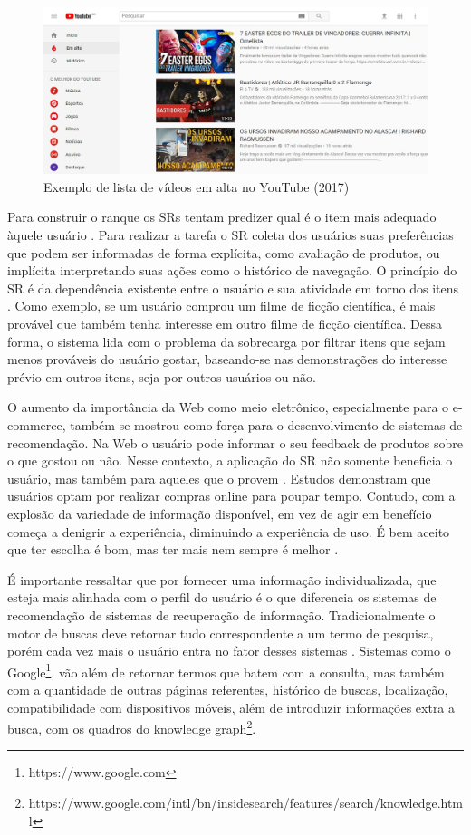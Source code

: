 \begin{figure}
	\centering
	\includegraphics[scale=0.50]{imagens/youtube.jpg}
	\caption{Exemplo de lista de vídeos em alta no YouTube (2017)}
	\label{fig:youtube_em_alta}
\end{figure} 

Para construir o ranque os SRs tentam predizer qual é o item mais adequado àquele usuário \citep{Ricci2011}. Para realizar a tarefa o SR coleta dos usuários suas preferências que podem ser informadas de forma explícita, como avaliação de produtos, ou implícita interpretando suas ações como o histórico de navegação. O princípio do SR é da dependência existente entre o usuário e sua atividade em torno dos itens \citep{Aggarwal:Intro:2016}. Como exemplo, se um usuário comprou um filme de ficção científica, é mais provável que também tenha interesse em outro filme de ficção científica. Dessa forma, o sistema lida com o problema da sobrecarga por filtrar itens que sejam menos prováveis do usuário gostar, baseando-se nas demonstrações do interesse prévio em outros itens, seja por outros usuários ou não.

O aumento da importância da Web como meio eletrônico, especialmente para o e-commerce, também se mostrou como força para o desenvolvimento de sistemas de recomendação.  Na Web o usuário pode informar o seu feedback de produtos sobre o que gostou ou não. Nesse contexto, a aplicação do SR não somente beneficia o usuário, mas também para aqueles que o provem \citep{ ISINKAYE2015261}. Estudos \citep{Mykolas:2015a} demonstram que usuários optam por realizar compras online para poupar tempo. Contudo, com a explosão da variedade de informação disponível, em vez de agir em benefício começa a denigrir a experiência, diminuindo a experiência de uso. É bem aceito que ter escolha é bom, mas ter mais nem sempre é melhor \citep{Ricci2011}.

É importante ressaltar que por fornecer uma informação individualizada, que esteja mais alinhada com o perfil do usuário é o que diferencia os sistemas de recomendação de sistemas de recuperação de informação. Tradicionalmente o motor de buscas deve retornar tudo correspondente a um termo de pesquisa, porém cada vez mais o usuário entra no fator desses sistemas \citep{Burke:2002:HRS:586321.586352}. Sistemas como o Google\footnote{https://www.google.com}, vão além de retornar termos que batem com a consulta, mas também com a quantidade de outras páginas referentes, histórico de buscas, localização, compatibilidade com dispositivos móveis, além de introduzir informações extra a busca, com os quadros do knowledge graph\footnote{ https://www.google.com/intl/bn/insidesearch/features/search/knowledge.html}.

